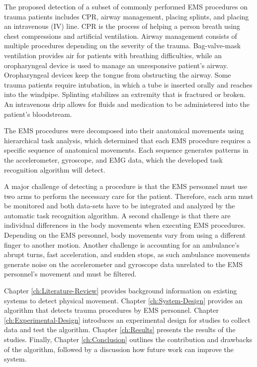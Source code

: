 \par The proposed detection of a subset of commonly performed EMS procedures on trauma patients includes \gls{CPR}, airway management, placing splints, and placing an intravenous (\gls{IV}) line. CPR is the process of helping a person breath using chest compressions and artificial ventilation. Airway management consists of multiple procedures depending on the severity of the trauma. Bag-valve-mask ventilation provides air for patients with breathing difficulties, while an oropharyngeal device is used to manage an unresponsive patient's airway. Oropharyngeal devices keep the tongue from obstructing the airway. Some trauma patients require intubation, in which a tube is inserted orally and reaches into the windpipe. Splinting stabilizes an extremity that is fractured or broken. An intravenous drip allows for fluids and medication to be administered into the patient’s bloodstream.
\par The EMS procedures were decomposed into their anatomical movements using hierarchical task analysis, which determined that each EMS procedure requires a specific sequence of anatomical movements. Each sequence generates patterns in the accelerometer, gyroscope, and EMG data, which the developed task recognition algorithm will detect.
\par A major challenge of detecting a procedure is that the EMS personnel must use two arms to perform the necessary care for the patient. Therefore, each arm must be monitored and both data-sets have to be integrated and analyzed by the automatic task recognition algorithm. A second challenge is that there are individual differences in the body movements when executing EMS procedures. Depending on the EMS personnel, body movements vary from using a different finger to another motion. Another challenge is accounting for an ambulance's abrupt turns, fast acceleration, and sudden stops, as such ambulance movements generate noise on the accelerometer and gyroscope data unrelated to the EMS personnel's movement and must be filtered.
\par Chapter \ref{ch:Literature-Review} provides background information on existing systems to detect physical movement. Chapter \ref{ch:System-Design} provides an algorithm that detects trauma procedures by \gls{EMS} personnel. Chapter \ref{ch:Experimental-Design} introduces an experimental design for studies to collect data and test the algorithm. Chapter \ref{ch:Results} presents the results of the studies. Finally, Chapter \ref{ch:Conclusion} outlines the contribution and drawbacks of the algorithm, followed by a discussion how future work can improve the system. 